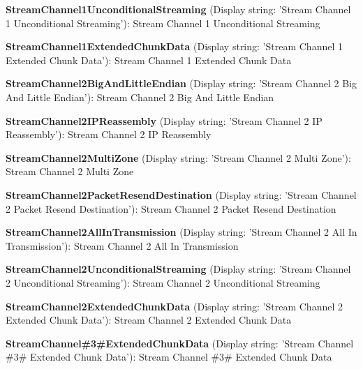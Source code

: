 \begin{DoxyItemize}
\item {\bfseries Stream\+Channel1\+Unconditional\+Streaming} (Display string\+: 'Stream Channel 1 Unconditional Streaming')\+: Stream Channel 1 Unconditional Streaming
\item {\bfseries Stream\+Channel1\+Extended\+Chunk\+Data} (Display string\+: 'Stream Channel 1 Extended Chunk Data')\+: Stream Channel 1 Extended Chunk Data
\item {\bfseries Stream\+Channel2\+Big\+And\+Little\+Endian} (Display string\+: 'Stream Channel 2 Big And Little Endian')\+: Stream Channel 2 Big And Little Endian
\item {\bfseries Stream\+Channel2\+I\+P\+Reassembly} (Display string\+: 'Stream Channel 2 I\+P Reassembly')\+: Stream Channel 2 I\+P Reassembly
\item {\bfseries Stream\+Channel2\+Multi\+Zone} (Display string\+: 'Stream Channel 2 Multi Zone')\+: Stream Channel 2 Multi Zone
\item {\bfseries Stream\+Channel2\+Packet\+Resend\+Destination} (Display string\+: 'Stream Channel 2 Packet Resend Destination')\+: Stream Channel 2 Packet Resend Destination
\item {\bfseries Stream\+Channel2\+All\+In\+Transmission} (Display string\+: 'Stream Channel 2 All In Transmission')\+: Stream Channel 2 All In Transmission
\item {\bfseries Stream\+Channel2\+Unconditional\+Streaming} (Display string\+: 'Stream Channel 2 Unconditional Streaming')\+: Stream Channel 2 Unconditional Streaming
\item {\bfseries Stream\+Channel2\+Extended\+Chunk\+Data} (Display string\+: 'Stream Channel 2 Extended Chunk Data')\+: Stream Channel 2 Extended Chunk Data
\item {\bfseries Stream\+Channel\#3\#Extended\+Chunk\+Data} (Display string\+: 'Stream Channel \#3\# Extended Chunk Data')\+: Stream Channel \#3\# Extended Chunk Data
\end{DoxyItemize}

